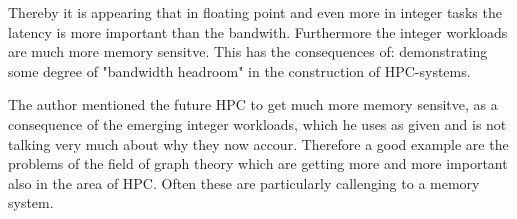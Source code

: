 \documentclass[a4paper,11pt]{scrartcl}
\begin{document}
Thereby it is appearing that in floating point and even more in integer tasks the 
latency is more important than the bandwith. Furthermore the integer workloads are much more memory sensitve. This has the consequences of: demonstrating some degree of "bandwidth headroom" in the construction of HPC-systems.

The author mentioned the future HPC to get much more memory sensitve, as a consequence of the emerging integer workloads, which he uses as given and is not talking very much about why they now accour. Therefore a good example are the problems of the field of graph theory which are getting more and more important also in the area of HPC. Often these are particularly callenging to a memory system. 
\end{document}
